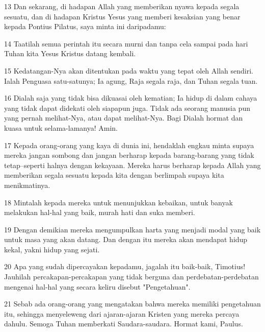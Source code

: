 \par 13 Dan sekarang, di hadapan Allah yang memberikan nyawa kepada segala sesuatu, dan di hadapan Kristus Yesus yang memberi kesaksian yang benar kepada Pontius Pilatus, saya minta ini daripadamu:
\par 14 Taatilah semua perintah itu secara murni dan tanpa cela sampai pada hari Tuhan kita Yesus Kristus datang kembali.
\par 15 Kedatangan-Nya akan ditentukan pada waktu yang tepat oleh Allah sendiri. Ialah Penguasa satu-satunya; Ia agung, Raja segala raja, dan Tuhan segala tuan.
\par 16 Dialah saja yang tidak bisa dikuasai oleh kematian; Ia hidup di dalam cahaya yang tidak dapat didekati oleh siapapun juga. Tidak ada seorang manusia pun yang pernah melihat-Nya, atau dapat melihat-Nya. Bagi Dialah hormat dan kuasa untuk selama-lamanya! Amin.
\par 17 Kepada orang-orang yang kaya di dunia ini, hendaklah engkau minta supaya mereka jangan sombong dan jangan berharap kepada barang-barang yang tidak tetap--seperti halnya dengan kekayaan. Mereka harus berharap kepada Allah yang memberikan segala sesuatu kepada kita dengan berlimpah supaya kita menikmatinya.
\par 18 Mintalah kepada mereka untuk menunjukkan kebaikan, untuk banyak melakukan hal-hal yang baik, murah hati dan suka memberi.
\par 19 Dengan demikian mereka mengumpulkan harta yang menjadi modal yang baik untuk masa yang akan datang. Dan dengan itu mereka akan mendapat hidup kekal, yakni hidup yang sejati.
\par 20 Apa yang sudah dipercayakan kepadamu, jagalah itu baik-baik, Timotius! Jauhilah percakapan-percakapan yang tidak berguna dan perdebatan-perdebatan mengenai hal-hal yang secara keliru disebut "Pengetahuan".
\par 21 Sebab ada orang-orang yang mengatakan bahwa mereka memiliki pengetahuan itu, sehingga menyeleweng dari ajaran-ajaran Kristen yang mereka percaya dahulu. Semoga Tuhan memberkati Saudara-saudara. Hormat kami, Paulus.


